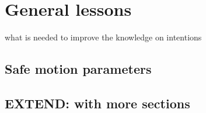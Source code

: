\chapter{General lessons}
what is needed to improve the knowledge on intentions

\section{Safe motion parameters}

\section{EXTEND: with more sections}